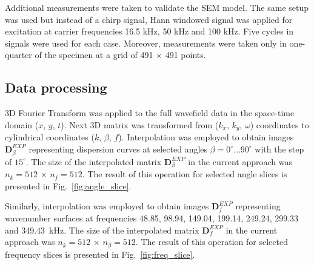 \documentclass[preprint,12pt]{elsarticle}
\newcommand{\matr}[1]{\mathbf{#1}} %
\begin{document}
Additional measurements were taken to validate the SEM model. 
The same setup was used but instead of a chirp signal, Hann windowed signal was applied for excitation at carrier frequencies 16.5 kHz, 50 kHz and 100 kHz. 
Five cycles in signals were used for each case. 
Moreover, measurements were taken only in one-quarter of the specimen at a grid of 491 $\times$ 491 points.
\subsection{Data processing}
3D Fourier Transform was applied to the full wavefield data in the space-time domain ($x$, $y$, $t$). 
Next 3D matrix was transformed from ($k_x$, $k_y$, $\omega$) coordinates to cylindrical coordinates ($k$, $\beta$, $f$). 
Interpolation was employed to obtain images $\matr{D}_{\beta}^{EXP}$ representing dispersion curves at selected angles $\beta = 0^{\circ} \ldots 90^{\circ}$ with the step of $15^{\circ}$. 
The size of the interpolated matrix $\matr{D}_{\beta}^{EXP}$ in the current approach was $n_k=512$ $\times$ $n_f= 512$. 
The result of this operation for selected angle slices is presented in Fig.~\ref{fig:angle_slice}. 

Similarly, interpolation was employed to obtain images $\matr{D}_{f}^{EXP}$ representing wavenumber surfaces at frequencies 48.85, 98.94, 149.04, 199.14, 249.24, 299.33 and 349.43~kHz.
The size of the interpolated matrix $\matr{D}_{f}^{EXP}$ in the current approach was $n_k=512$ $\times$ $n_{\beta}= 512$.
The result of this operation for selected frequency slices is presented in Fig.~\ref{fig:freq_slice}.
\end{document}
